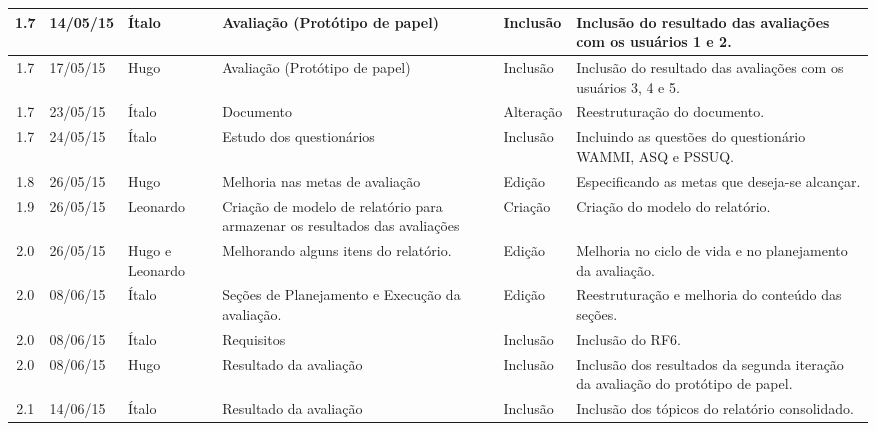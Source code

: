 \begin{longtable}{|c|m{2cm}|m{2.8cm}|m{2.3cm}|m{2.44cm}|m{4.2cm}|}
  \hline                               
  1.7 & 14/05/15 & Ítalo & Avaliação (Protótipo de papel) & Inclusão & Inclusão do resultado das avaliações com os usuários 1 e 2.\\
  
  \hline                               
  1.7 & 17/05/15 & Hugo & Avaliação (Protótipo de papel) & Inclusão & Inclusão do resultado das avaliações com os usuários 3, 4 e 5.\\
  
  \hline                               
  1.7 & 23/05/15 & Ítalo & Documento & Alteração & Reestruturação do documento.\\
  
  \hline                               
  1.7 & 24/05/15 & Ítalo & Estudo dos questionários & Inclusão & Incluindo as questões do questionário WAMMI, ASQ e PSSUQ.\\
  
  \hline                               
  1.8 & 26/05/15 & Hugo & Melhoria nas metas de avaliação & Edição & Especificando as metas que deseja-se alcançar.\\
  
  \hline                               
  1.9 & 26/05/15 & Leonardo & Criação de modelo de relatório para armazenar os resultados das avaliações & Criação & Criação do modelo do relatório.\\
  
  \hline                               
  2.0 & 26/05/15 & Hugo e Leonardo & Melhorando alguns itens do relatório. & Edição & Melhoria no ciclo de vida e no planejamento da avaliação.\\
  
  \hline                               
  2.0 & 08/06/15 & Ítalo & Seções de Planejamento e Execução da avaliação. & Edição & Reestruturação e melhoria do conteúdo das seções.\\
  
  \hline                               
  2.0 & 08/06/15 & Ítalo & Requisitos & Inclusão & Inclusão do RF6.\\  
  
  \hline                               
  2.0 & 08/06/15 & Hugo & Resultado da avaliação & Inclusão & Inclusão dos resultados da segunda iteração da avaliação do protótipo de papel.\\ 
  \hline                               
  
  2.1 & 14/06/15 & Ítalo & Resultado da avaliação & Inclusão & Inclusão dos tópicos do relatório consolidado.\\   
  \hline
  

\end{longtable}
